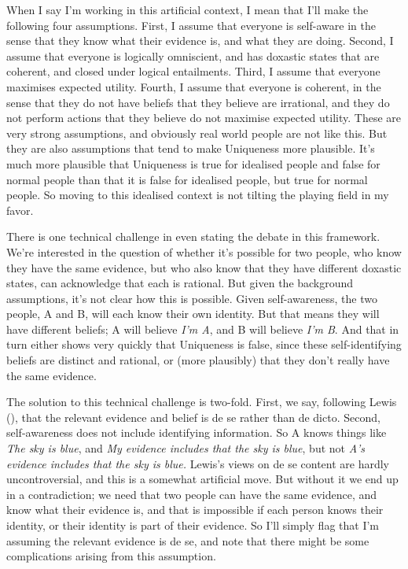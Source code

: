 \documentclass[
  10pt,
  letterpaper,
  DIV=11,
  numbers=noendperiod,
  twoside]{scrartcl}
\begin{document}
When I say I'm working in this artificial context, I mean that I'll make
the following four assumptions. First, I assume that everyone is
self-aware in the sense that they know what their evidence is, and what
they are doing. Second, I assume that everyone is logically omniscient,
and has doxastic states that are coherent, and closed under logical
entailments. Third, I assume that everyone maximises expected utility.
Fourth, I assume that everyone is coherent, in the sense that they do
not have beliefs that they believe are irrational, and they do not
perform actions that they believe do not maximise expected utility.
These are very strong assumptions, and obviously real world people are
not like this. But they are also assumptions that tend to make
Uniqueness more plausible. It's much more plausible that Uniqueness is
true for idealised people and false for normal people than that it is
false for idealised people, but true for normal people. So moving to
this idealised context is not tilting the playing field in my favor.

There is one technical challenge in even stating the debate in this
framework. We're interested in the question of whether it's possible for
two people, who know they have the same evidence, but who also know that
they have different doxastic states, can acknowledge that each is
rational. But given the background assumptions, it's not clear how this
is possible. Given self-awareness, the two people, A and B, will each
know their own identity. But that means they will have different
beliefs; A will believe \emph{I'm A}, and B will believe \emph{I'm B}.
And that in turn either shows very quickly that Uniqueness is false,
since these self-identifying beliefs are distinct and rational, or (more
plausibly) that they don't really have the same evidence.

The solution to this technical challenge is two-fold. First, we say,
following Lewis (), that the relevant
evidence and belief is de se rather than de dicto. Second,
self-awareness does not include identifying information. So A knows
things like \emph{The sky is blue}, and \emph{My evidence includes that
the sky is blue}, but not \emph{A's evidence includes that the sky is
blue.} Lewis's views on de se content are hardly uncontroversial, and
this is a somewhat artificial move. But without it we end up in a
contradiction; we need that two people can have the same evidence, and
know what their evidence is, and that is impossible if each person knows
their identity, or their identity is part of their evidence. So I'll
simply flag that I'm assuming the relevant evidence is de se, and note
that there might be some complications arising from this assumption.
\end{document}
